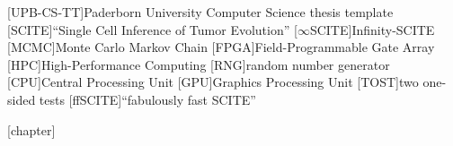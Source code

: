 \theoremstyle{definition}
\newtheorem{definition}{Definition}[chapter]
\newtheorem{example}[definition]{Example}

\theoremstyle{plain}
\newtheorem{lemma}[definition]{Lemma}
\newtheorem{theorem}[definition]{Theorem}
\newtheorem{corollary}[definition]{Corollary}


\newcommand*{\eg}{e.\,g.}
\newcommand*{\ie}{i.\,e.}
\newcommand*{\cf}{c.\,f.}
\newcommand*{\etal}{et~al.}

[UPB-CS-TT]{Paderborn University Computer Science thesis template}
[SCITE]{``Single Cell Inference of Tumor Evolution''}
[$\infty$SCITE]{Infinity-SCITE}
[MCMC]{Monte Carlo Markov Chain}
[FPGA]{Field-Programmable Gate Array}
[HPC]{High-Performance Computing}
[RNG]{random number generator}
[CPU]{Central Processing Unit}
[GPU]{Graphics Processing Unit}
[TOST]{two one-sided tests}
[ffSCITE]{``fabulously fast SCITE''}

\DeclareMathOperator*{\argmax}{arg\,max}
\DeclareMathOperator*{\argmin}{arg\,min}


[chapter]
